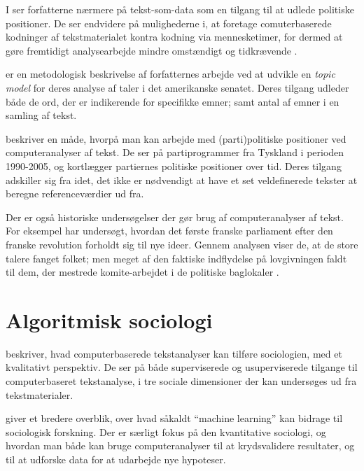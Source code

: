 I  ser forfatterne nærmere på tekst-som-data som en tilgang til at udlede politiske positioner.
De ser endvidere på mulighederne i, at foretage comuterbaserede kodninger af tekstmaterialet kontra kodning via mennesketimer, for dermed at gøre fremtidigt analysearbejde mindre omstændigt og tidkrævende \autocite{laverExtractingPolicyPositions2003}.

\autocite{quinnHowAnalyzePolitical2010} er en metodologisk beskrivelse af forfatternes arbejde ved at udvikle en \textit{topic model} for deres analyse af taler i det amerikanske senatet.
Deres tilgang udleder både de ord, der er indikerende for specifikke emner; samt antal af emner i en samling af tekst.

\autocite{slapinScalingModelEstimating2008} beskriver en måde, hvorpå man kan arbejde med (parti)politiske positioner ved computeranalyser af tekst.
De ser på partiprogrammer fra Tyskland i perioden 1990-2005, og kortlægger partiernes politiske positioner over tid.
Deres tilgang adskiller sig fra \citeauthor{laverExtractingPolicyPositions2003} idet, det ikke er nødvendigt at have et set veldefinerede tekster at beregne referenceværdier ud fra.

Der er også historiske undersøgelser der gør brug af computeranalyser af tekst.
For eksempel har \citeauthor{barronIndividualsInstitutionsInnovation2018} undersøgt, hvordan det første franske parliament efter den franske revolution forholdt sig til nye ideer.
Gennem analysen viser de, at de store talere fanget folket; men meget af den faktiske indflydelse på lovgivningen faldt til dem, der mestrede komite-arbejdet i de politiske baglokaler \autocite{barronIndividualsInstitutionsInnovation2018}. 

\section{Algoritmisk sociologi}\label{sec:review-compsoc}

\cite{evansMachineTranslationMining2016} beskriver, hvad computerbaserede tekstanalyser kan tilføre sociologien, med et kvalitativt perspektiv.
De ser på både superviserede og usuperviserede tilgange til computerbaseret tekstanalyse, i tre sociale dimensioner der kan undersøges ud fra tekstmaterialer.

 \cite{molinaMachineLearningSociology2019} giver et bredere overblik, over hvad såkaldt “machine learning” kan bidrage til sociologisk forskning.
Der er særligt fokus på den kvantitative sociologi, og hvordan man både kan bruge computeranalyser til at krydsvalidere resultater, og til at udforske data for at udarbejde nye hypoteser.

